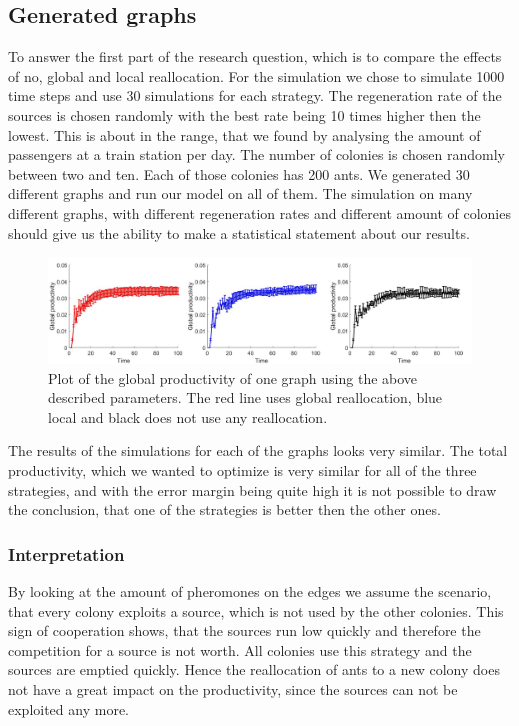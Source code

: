 \subsection{Generated graphs} \label{results1}
To answer the first part of the research question, which is to compare the effects of no, global and local reallocation. For the simulation we chose to simulate 1000 time steps and use 30 simulations for each strategy. The regeneration rate of the sources is chosen randomly with the best rate being 10 times higher then the lowest. This is about in the range, that we found by analysing the amount of passengers at a train station per day. The number of colonies is chosen randomly between two and ten. Each of those colonies has 200 ants. We generated 30 different graphs and run our model on all of them. The simulation on many different graphs, with different regeneration rates and different amount of colonies should give us the ability to make a statistical statement about our results.

\begin{figure}[H]
	\centering
	\includegraphics[scale=0.5]{globalProductivity.pdf}
	\caption{Plot of the global productivity of one graph using the above described parameters. The red line uses global reallocation, blue local and black does not use any reallocation.}
\end{figure}
The results of the simulations for each of the graphs looks very similar. The total productivity, which we wanted to optimize is very similar for all of the three strategies, and with the error margin being quite high it is not possible to draw the conclusion, that one of the strategies is better then the other ones. 
\subsubsection{Interpretation}
By looking at the amount of pheromones on the edges we assume the scenario, that every colony exploits a source, which is not used by the other colonies. This sign of cooperation shows, that the sources run low quickly and therefore the competition for a source is not worth. All colonies use this strategy and the sources are emptied quickly. Hence the reallocation of ants to a new colony does not have a great impact on the productivity, since the sources can not be exploited any more. 


